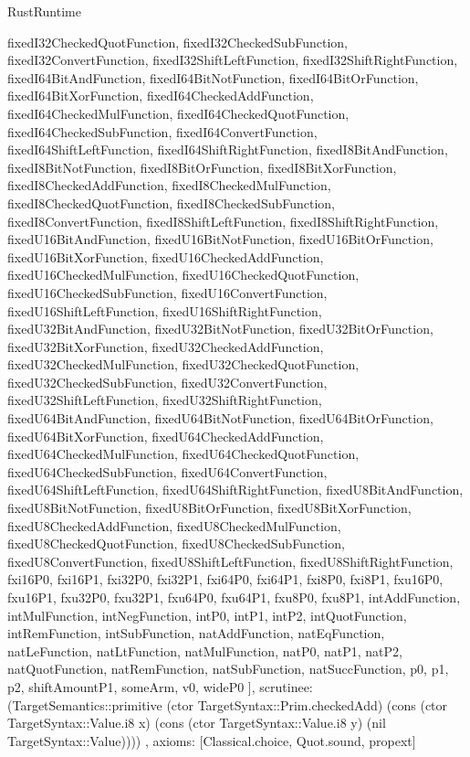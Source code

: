 \begin{lexlean}{RustRuntime}
\begin{semanticmodule}
{{      fixedI32CheckedQuotFunction,
      fixedI32CheckedSubFunction,
      fixedI32ConvertFunction,
      fixedI32ShiftLeftFunction,
      fixedI32ShiftRightFunction,
      fixedI64BitAndFunction,
      fixedI64BitNotFunction,
      fixedI64BitOrFunction,
      fixedI64BitXorFunction,
      fixedI64CheckedAddFunction,
      fixedI64CheckedMulFunction,
      fixedI64CheckedQuotFunction,
      fixedI64CheckedSubFunction,
      fixedI64ConvertFunction,
      fixedI64ShiftLeftFunction,
      fixedI64ShiftRightFunction,
      fixedI8BitAndFunction,
      fixedI8BitNotFunction,
      fixedI8BitOrFunction,
      fixedI8BitXorFunction,
      fixedI8CheckedAddFunction,
      fixedI8CheckedMulFunction,
      fixedI8CheckedQuotFunction,
      fixedI8CheckedSubFunction,
      fixedI8ConvertFunction,
      fixedI8ShiftLeftFunction,
      fixedI8ShiftRightFunction,
      fixedU16BitAndFunction,
      fixedU16BitNotFunction,
      fixedU16BitOrFunction,
      fixedU16BitXorFunction,
      fixedU16CheckedAddFunction,
      fixedU16CheckedMulFunction,
      fixedU16CheckedQuotFunction,
      fixedU16CheckedSubFunction,
      fixedU16ConvertFunction,
      fixedU16ShiftLeftFunction,
      fixedU16ShiftRightFunction,
      fixedU32BitAndFunction,
      fixedU32BitNotFunction,
      fixedU32BitOrFunction,
      fixedU32BitXorFunction,
      fixedU32CheckedAddFunction,
      fixedU32CheckedMulFunction,
      fixedU32CheckedQuotFunction,
      fixedU32CheckedSubFunction,
      fixedU32ConvertFunction,
      fixedU32ShiftLeftFunction,
      fixedU32ShiftRightFunction,
      fixedU64BitAndFunction,
      fixedU64BitNotFunction,
      fixedU64BitOrFunction,
      fixedU64BitXorFunction,
      fixedU64CheckedAddFunction,
      fixedU64CheckedMulFunction,
      fixedU64CheckedQuotFunction,
      fixedU64CheckedSubFunction,
      fixedU64ConvertFunction,
      fixedU64ShiftLeftFunction,
      fixedU64ShiftRightFunction,
      fixedU8BitAndFunction,
      fixedU8BitNotFunction,
      fixedU8BitOrFunction,
      fixedU8BitXorFunction,
      fixedU8CheckedAddFunction,
      fixedU8CheckedMulFunction,
      fixedU8CheckedQuotFunction,
      fixedU8CheckedSubFunction,
      fixedU8ConvertFunction,
      fixedU8ShiftLeftFunction,
      fixedU8ShiftRightFunction,
      fxi16P0,
      fxi16P1,
      fxi32P0,
      fxi32P1,
      fxi64P0,
      fxi64P1,
      fxi8P0,
      fxi8P1,
      fxu16P0,
      fxu16P1,
      fxu32P0,
      fxu32P1,
      fxu64P0,
      fxu64P1,
      fxu8P0,
      fxu8P1,
      intAddFunction,
      intMulFunction,
      intNegFunction,
      intP0,
      intP1,
      intP2,
      intQuotFunction,
      intRemFunction,
      intSubFunction,
      natAddFunction,
      natEqFunction,
      natLeFunction,
      natLtFunction,
      natMulFunction,
      natP0,
      natP1,
      natP2,
      natQuotFunction,
      natRemFunction,
      natSubFunction,
      natSuccFunction,
      p0,
      p1,
      p2,
      shiftAmountP1,
      someArm,
      v0,
      wideP0
    ],
    scrutinee: (TargetSemantics::primitive (ctor TargetSyntax::Prim.checkedAdd) (cons (ctor TargetSyntax::Value.i8 x) (cons (ctor TargetSyntax::Value.i8 y) (nil TargetSyntax::Value))))
  },
  axioms: [Classical.choice, Quot.sound, propext]
}


\end{semanticmodule}
\end{lexlean}
